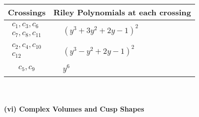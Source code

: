 \documentclass[1p]{elsarticle_modified}
\theoremstyle{definition}
\begin{document}
\begin{tabular}{m{50pt}|m{274pt}}
Crossings & \hspace{64pt}Riley Polynomials at each crossing \\
\hline $$\begin{aligned}c_{1},c_{3},c_{6}\\c_{7},c_{8},c_{11}\end{aligned}$$&$\begin{aligned}
&(y^3+3 y^2+2 y-1)^2
\end{aligned}$\\
\hline $$\begin{aligned}c_{2},c_{4},c_{10}\\c_{12}\end{aligned}$$&$\begin{aligned}
&(y^3- y^2+2 y-1)^2
\end{aligned}$\\
\hline $$\begin{aligned}c_{5},c_{9}\end{aligned}$$&$\begin{aligned}
&y^6
\end{aligned}$\\
\hline
\end{tabular}\\~\\
\newpage\flushleft \textbf{(vi) Complex Volumes and Cusp Shapes}
\end{document}
